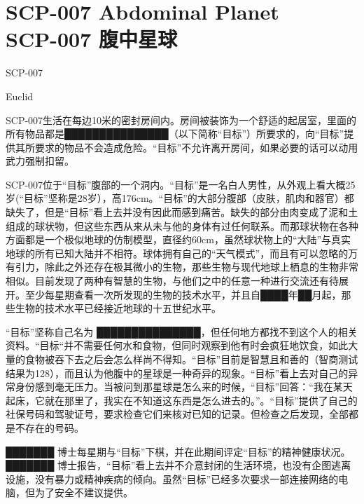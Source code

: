\chapter[SCP-007 腹中星球]{
	SCP-007 Abdominal Planet\\
	SCP-007 腹中星球
}

\label{chap:SCP-007}

SCP-007

Euclid

SCP-007生活在每边10米的密封房间内。房间被装饰为一个舒适的起居室，里面的所有物品都是███████████████（以下简称“目标”）所要求的，向“目标”提供其所要求的物品不会造成危险。“目标”不允许离开房间，如果必要的话可以动用武力强制扣留。

SCP-007位于“目标”腹部的一个洞内。“目标”是一名白人男性，从外观上看大概25岁(“目标”坚称是28岁），高176cm。“目标”的大部分腹部（皮肤，肌肉和器官）都缺失了，但是“目标”看上去并没有因此而感到痛苦。缺失的部分由肉变成了泥和土组成的球状物，但这些东西从来从未与他的身体有过任何联系。而那球状物在各种方面都是一个极似地球的仿制模型，直径约60cm，虽然球状物上的“大陆”与真实地球的所有已知大陆并不相符。球体拥有自己的“天气模式”，而且有可以忽略的万有引力，除此之外还存在极其微小的生物，那些生物与现代地球上栖息的生物非常相似。目前发现了两种有智慧的生物，与他们之中的任意一种进行交流还有待展开。至少每星期查看一次所发现的生物的技术水平，并且自████年██月起，那些生物的技术水平已经接近地球的十五世纪水平。

“目标”坚称自己名为 ███████████████，但任何地方都找不到这个人的相关资料。“目标“并不需要任何水和食物，但同时观察到他有时会疯狂地饮食，如此大量的食物被吞下去之后会怎么样尚不得知。“目标”目前是智慧且和善的（智商测试结果为128），而且认为他腹中的星球是一种奇异的现象。“目标”看上去对自己的异常身份感到毫无压力。当被问到那星球是怎么来的时候，“目标”回答：“我在某天起床，它就在那里了，我实在不知道这东西是怎么进去的。”。“目标”提供了自己的社保号码和驾驶证号，要求检查它们来核对已知的记录。但检查之后发现，全部都是不存在的号码。

███████ 博士每星期与“目标”下棋，并在此期间评定“目标”的精神健康状况。 ███████ 博士报告，“目标”看上去并不介意封闭的生活环境，也没有企图逃离设施，没有暴力或精神疾病的倾向。虽然“目标”已经多次要求一部连接网络的电脑，但为了安全不建议提供。
